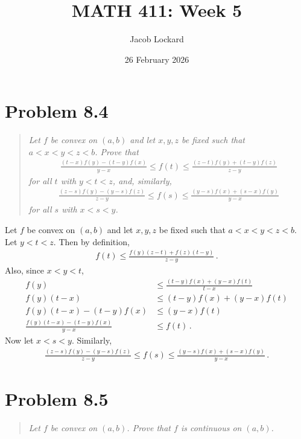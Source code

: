 \documentclass{article}
\begin{document}
\title{MATH 411: Week 5}
\author{Jacob Lockard}
\date{26 February 2026}

\maketitle

\section*{Problem 8.4}

\begin{quote}
    \itshape
    Let $f$ be convex on $(a, b)$ and let $x, y, z$ be fixed such that
    $a < x < y < z < b$. Prove that
    \begin{align*}
        \frac{(t-x)f(y) - (t-y)f(x)}{y-x} \leq f(t) \leq \frac{(z-t)f(y)+(t-y)f(z)}{z-y}
    \end{align*}
    for all $t$ with $y < t < z$, and, similarly,
    \begin{align*}
        \frac{(z-s)f(y)-(y-s)f(z)}{z-y} \leq f(s) \leq \frac{(y-s)f(x)+(s-x)f(y)}{y-x}
    \end{align*}
    for all $s$ with $x < s < y$.
\end{quote}

Let $f$ be convex on $(a, b)$ and let $x, y, z$ be fixed such that
$a < x < y < z < b$. Let $y < t < z$. Then by definition,
\begin{align*}
    f(t) \leq \frac{f(y)(z-t) + f(z)(t-y)}{z - y} \,.
\end{align*}
Also, since $x < y < t$,
\begin{align*}
    f(y) &\leq \frac{(t-y)f(x) + (y-x)f(t)}{t-x} \\
    f(y)(t-x) &\leq (t-y)f(x) + (y-x)f(t) \\
    f(y)(t-x) - (t-y)f(x) &\leq (y-x)f(t) \\
    \frac{f(y)(t-x) - (t-y)f(x)}{y-x} &\leq f(t) \,.
\end{align*}
Now let $x < s < y$. Similarly,
\begin{align*}
    \frac{(z-s)f(y)-(y-s)f(z)}{z-y} \leq f(s) \leq \frac{(y-s)f(x)+(s-x)f(y)}{y-x} \,.
\end{align*}

\qedsymbol

\section*{Problem 8.5}

\begin{quote}
    \itshape
    Let $f$ be convex on $(a,b)$. Prove that $f$ is continuous on $(a,b)$.
\end{quote}
\end{document}
